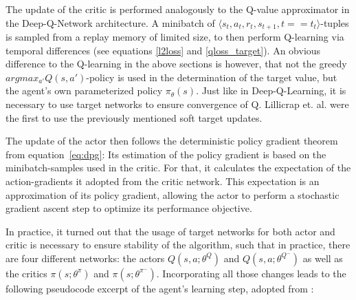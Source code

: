 The update of the critic is performed analogously to the Q-value approximator in the Deep-Q-Network architecture. A minibatch of $\langle s_t, a_t, r_t, s_{t+1}, t==t_t \rangle$-tuples is sampled from a replay memory of limited size, to then perform Q-learning via temporal differences (see equations \ref{l2loss} and \ref{qloss_target}). An obvious difference to the Q-learning in the above sections is however, that not the greedy $argmax_{a'}Q(s,a')$-policy is used in the determination of the target value, but the agent's own parameterized policy $\pi_\theta(s)$. Just like in Deep-Q-Learning, it is necessary to use target networks to ensure convergence of Q. Lillicrap et. al. \cite{lillicrap_continuous_2015} were the first to use the previously mentioned soft target updates.

The update of the actor then follows the deterministic policy gradient theorem from equation~\ref{eq:dpg}: Its estimation of the policy gradient is based on the minibatch-samples used in the critic. For that, it calculates the expectation of the action-gradients it adopted from the critic network. This expectation is an approximation of its policy gradient, allowing the actor to perform a stochastic gradient ascent step to optimize its performance objective.

In practice, it turned out that the usage of target networks for both actor and critic is necessary to ensure stability of the algorithm, such that in practice, there are four different networks: the actors $Q(s,a;\theta^Q)$ and $Q(s,a;\theta^{Q^-})$ as well as the critics $\pi(s;\theta^\pi)$ and $\pi(s;\theta^{\pi^-})$. Incorporating all those changes leads to the following pseudocode excerpt of the agent's learning step, adopted from \cite{lillicrap_continuous_2015}: \\

